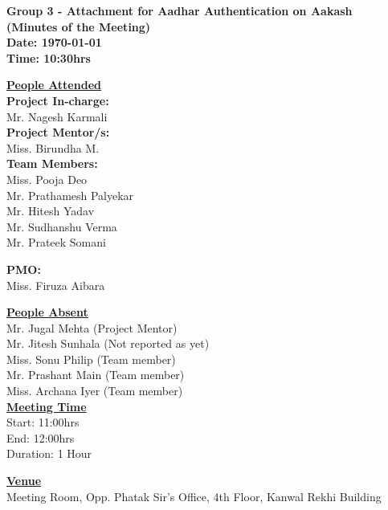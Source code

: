 \documentclass[a4paper,12pt]{article}
\begin{document}
\LARGE
\begin{center}
\textbf
{
Group 3 - Attachment for Aadhar Authentication on Aakash\\
(Minutes of the Meeting) \\ 
Date: \today \\
Time: 10:30hrs
}
\end{center}

\vfill

\large

\underline{\textbf{People Attended}} \\ 

\indent \textbf{Project In-charge:} \\
\indent Mr. Nagesh Karmali \\

\indent \textbf{Project Mentor/s:} \\
\indent Miss. Birundha M.\\

\indent \textbf{Team Members:} \\
\indent Miss. Pooja Deo \\
\indent Mr. Prathamesh Palyekar \\
\indent Mr. Hitesh Yadav \\
\indent Mr. Sudhanshu Verma \\
\indent Mr. Prateek Somani 

\indent \textbf{PMO:} \\
\indent Miss. Firuza Aibara

\underline{\textbf{People Absent}} \\ 
\indent Mr. Jugal Mehta (Project Mentor)\\
\indent Mr. Jitesh Sunhala (Not reported as yet)\\
\indent Miss. Sonu Philip (Team member)\\
\indent Mr. Prashant Main (Team member)\\
\indent Miss. Archana Iyer (Team member) \\

\vskip20pt
\underline{\textbf{Meeting Time}} \\
\indent Start: 11:00hrs \\
\indent End: 12:00hrs \\
\indent Duration: 1 Hour 

\underline{\textbf{Venue}} \\
\indent Meeting Room, Opp. Phatak Sir's Office, 4th Floor, Kanwal Rekhi Building

\pagebreak
\end{document}
